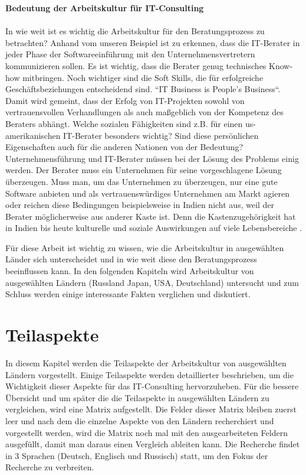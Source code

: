 	\textbf{ Bedeutung der Arbeitskultur für IT-Consulting}\\ \\
	In wie weit ist es wichtig die Arbeitskultur für den Beratungsprozess zu betrachten? Anhand vom unseren Beispiel ist zu erkennen, dass die IT-Berater in jeder Phase der Softwareeinführung mit den Unternehmensvertretern kommunizieren sollen. Es ist wichtig, dass die Berater genug technisches Know-how mitbringen. Noch wichtiger sind die Soft Skills, die für erfolgreiche Geschäftsbeziehungen entscheidend sind. ``IT Business is People's Business``. Damit wird gemeint, dass der Erfolg von IT-Projekten sowohl von vertrauensvollen Verhandlungen als auch maßgeblich von der Kompetenz des Beraters abhängt. \cite{ITConsRu}
	Welche sozialen Fähigkeiten sind z.B. für einen us-amerikanischen IT-Berater besonders wichtig? Sind diese persönlichen Eigenschaften auch für die anderen Nationen von der Bedeutung? Unternehmensführung und IT-Berater müssen bei der Lösung des Problems einig werden. Der Berater muss ein Unternehmen für seine vorgeschlagene Lösung überzeugen. Muss man, um das Unternehmen zu überzeugen, nur eine gute Software anbieten und als vertrauenswürdiges Unternehmen am Markt agieren oder reichen diese Bedingungen beispielsweise in Indien nicht aus, weil der Berater möglicherweise aus anderer Kaste ist. Denn die Kastenzugehörigkeit hat in Indien bis heute kulturelle und soziale Auswirkungen auf viele Lebensbereiche \cite{KastensystemInd}.

	Für diese Arbeit ist wichtig zu wissen, wie die Arbeitskultur in ausgewählten Länder sich unterscheidet und in wie weit diese den Beratungsprozess beeinflussen kann.
	In den folgenden Kapiteln wird Arbeitskultur von ausgewählten Ländern (Russland Japan, USA, Deutschland) untersucht und zum Schluss werden einige interessante Fakten verglichen und diskutiert. 
\section{Teilaspekte}
	In diesem Kapitel werden die Teilaspekte der Arbeitskultur von ausgewählten Ländern vorgestellt. Einige Teilaspekte werden detaillierter beschrieben, um die Wichtigkeit dieser Aspekte für das IT-Consulting hervorzuheben. Für die bessere Übersicht und um später die die Teilaspekte in ausgewählten Ländern zu vergleichen, wird eine Matrix aufgestellt. Die Felder dieser Matrix bleiben zuerst leer und nach dem die einzelne Aspekte von den Ländern recherchiert und vorgestellt werden, wird die Matrix noch mal mit den ausgearbeiteten Feldern ausgefüllt, damit man daraus einen Vergleich ableiten kann. Die Recherche findet in 3 Sprachen (Deutsch, Englisch und Russisch) statt, um den Fokus der Recherche zu verbreiten.
	
